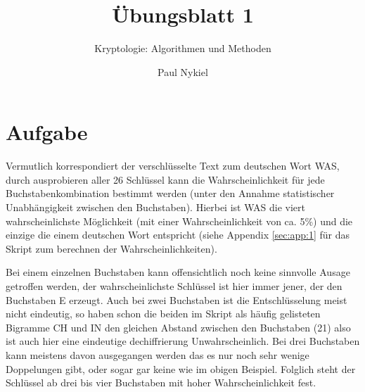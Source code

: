 \documentclass[DIN, pagenumber=false, fontsize=11pt, parskip=half]{scrartcl}
\title{Übungsblatt 1}
\subtitle{Kryptologie: Algorithmen und Methoden}
\author{Paul Nykiel}
\begin{document}
    \maketitle
    
    \section{Aufgabe}
    Vermutlich korrespondiert der verschlüsselte Text zum deutschen Wort \glqq{}WAS\grqq{},
    durch ausprobieren aller 26 Schlüssel kann die Wahrscheinlichkeit für jede
    Buchstabenkombination bestimmt werden (unter den Annahme statistischer Unabhängigkeit zwischen den Buchstaben). 
    Hierbei ist \glqq{}WAS\grqq{} die viert wahrscheinlichste Möglichkeit (mit einer Wahrscheinlichkeit von ca. 5\%) und die einzige die einem deutschen Wort entspricht (siehe Appendix \ref{sec:app:1} für das Skript zum berechnen der Wahrscheinlichkeiten).

    Bei einem einzelnen Buchstaben kann offensichtlich noch keine sinnvolle Ausage getroffen werden, der wahrscheinlichste Schlüssel ist hier immer jener, der den Buchstaben \glqq{}E\grqq{} erzeugt. 
    Auch bei zwei Buchstaben ist die Entschlüsselung meist nicht eindeutig, so haben schon die beiden im Skript als häufig gelisteten Bigramme \glqq{}CH\grqq{} und \glqq{}IN\grqq{} den gleichen Abstand zwischen den Buchstaben (21) also ist auch hier eine eindeutige dechiffrierung Unwahrscheinlich.
    Bei drei Buchstaben kann meistens davon ausgegangen werden das es nur noch sehr wenige Doppelungen gibt, oder sogar gar keine wie im obigen Beispiel.
    Folglich steht der Schlüssel ab drei bis vier Buchstaben mit hoher Wahrscheinlichkeit fest.
\end{document}
